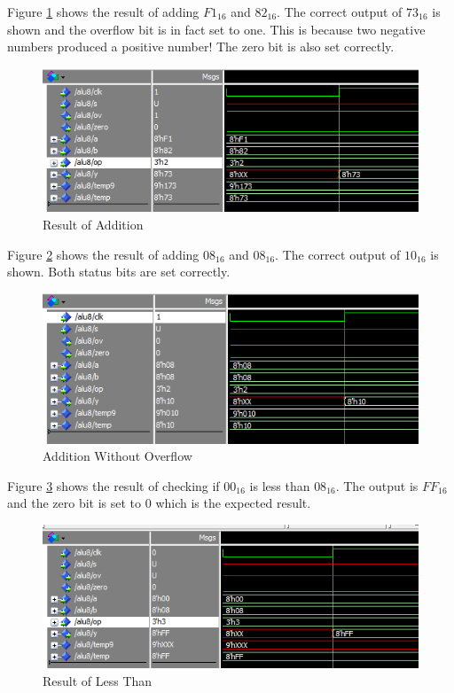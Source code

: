 \documentclass[12pt]{article}
\begin{document}
Figure \ref{fig:addition} shows the result of adding $F1_{16}$ and $82_{16}$. The correct output of $73_{16}$ is shown and the overflow bit is in fact set to one. This is because two negative numbers produced a positive number! The zero bit is also set correctly.

\begin{figure}[H]
\centering
\includegraphics[width=1\linewidth]{addition}
\caption{Result of Addition}
\label{fig:addition}
\end{figure}

Figure \ref{fig:addition-no-overflow} shows the result of adding $08_{16}$ and $08_{16}$. The correct output of $10_{16}$ is shown. Both status bits are set correctly.

\begin{figure}[H]
\centering
\includegraphics[width=1\linewidth]{addition-no-overflow}
\caption{Addition Without Overflow}
\label{fig:addition-no-overflow}
\end{figure}

Figure \ref{fig:less-than} shows the result of checking if $00_{16}$ is less than $08_{16}$. The output is $FF_{16}$ and the zero bit is set to 0 which is the expected result.

\begin{figure}[H]
\centering
\includegraphics[width=1\linewidth]{less-than}
\caption{Result of Less Than}
\label{fig:less-than}
\end{figure}
\end{document}
